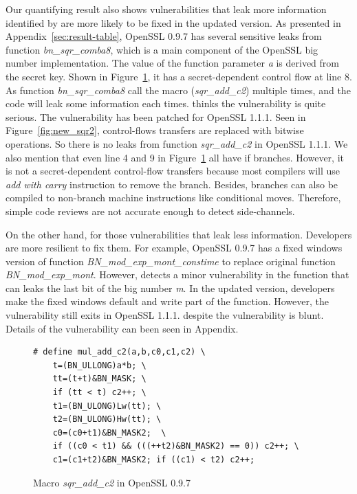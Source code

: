 Our quantifying result also shows vulnerabilities
that leak more information identified by \tool{} 
are more likely to be fixed in the updated version.
As presented in Appendix~\ref{sec:result-table}, 
OpenSSL 0.9.7 has several sensitive leaks from
function \emph{bn\_sqr\_comba8}, which is a main 
component of the OpenSSL big number implementation.
The value of the function parameter \emph{a} is derived from
the secret key. 
Shown in Figure~\ref{fig:old_sqr2}, it has a 
secret-dependent control flow at line 8.
As function \emph{bn\_sqr\_comba8}
call the macro (\emph{sqr\_add\_c2}) multiple times, 
and the code will leak some information each times.
\tool{} thinks the vulnerability is quite serious. 
The vulnerability has been patched for OpenSSL 1.1.1. Seen in 
Figure~\ref{fig:new_sqr2}, control-flows transfers are replaced
with bitwise operations. So there is no leaks from function
\emph{sqr\_add\_c2} in OpenSSL 1.1.1. We also mention
that even line 4 and 9 in Figure~\ref{fig:old_sqr2} all have if branches.
However, it is not a secret-dependent control-flow transfers because
most compilers will use \emph{add with carry} instruction to remove the branch.
Besides, branches can also be compiled to non-branch machine instructions 
like conditional moves. Therefore, simple code reviews are not accurate
enough to detect side-channels. 

On the other hand, for those vulnerabilities that leak less information. 
Developers are more resilient to fix them. 
For example, OpenSSL 0.9.7 has a fixed windows version of 
function \emph{BN\_mod\_exp\_mont\_constime} to replace original function
\emph{BN\_mod\_exp\_mont}.
However, \tool{} detects a minor vulnerability in the function that can
leaks the last bit of the big number \emph{m}. In the updated version,
developers make the fixed windows default and write part of the 
function. However, the vulnerability still exits in OpenSSL 1.1.1.
despite the vulnerability is blunt. Details of the 
vulnerability can been seen in Appendix.


\begin{figure}
    \centering
    \begin{lstlisting}[xleftmargin=.02\textwidth,xrightmargin=.01\textwidth]
# define mul_add_c2(a,b,c0,c1,c2) \
    t=(BN_ULLONG)a*b; \
    tt=(t+t)&BN_MASK; \
    if (tt < t) c2++; \
    t1=(BN_ULONG)Lw(tt); \
    t2=(BN_ULONG)Hw(tt); \
    c0=(c0+t1)&BN_MASK2;  \
    if ((c0 < t1) && (((++t2)&BN_MASK2) == 0)) c2++; \
    c1=(c1+t2)&BN_MASK2; if ((c1) < t2) c2++;
\end{lstlisting}
    \vspace*{-6pt}
    \caption{Macro \textit{sqr\_add\_c2} in OpenSSL 0.9.7}
    \label{fig:old_sqr2}
    \vspace*{-6pt}
\end{figure}



